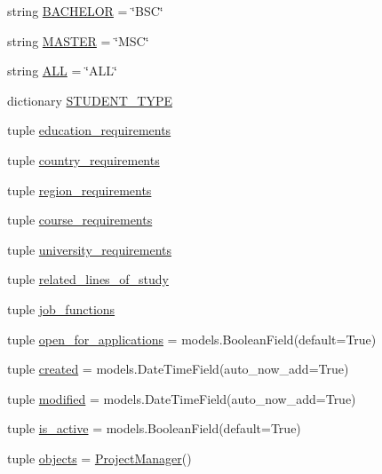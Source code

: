 \begin{DoxyCompactItemize}
\item 
string \hyperlink{classprojects_1_1models_1_1_project_aa7280baf9a6ecb59f892c5d3e7ad4345}{B\-A\-C\-H\-E\-L\-O\-R} = \char`\"{}B\-S\-C\char`\"{}
\item 
string \hyperlink{classprojects_1_1models_1_1_project_a07c53fc2393e77a3cd5ae3c12f4d4441}{M\-A\-S\-T\-E\-R} = \char`\"{}M\-S\-C\char`\"{}
\item 
string \hyperlink{classprojects_1_1models_1_1_project_a1abb3db31156e503feeab76b92ad3915}{A\-L\-L} = \char`\"{}A\-L\-L\char`\"{}
\item 
dictionary \hyperlink{classprojects_1_1models_1_1_project_ac3f6c8d9f7ebc77cb51c414beb0da1ff}{S\-T\-U\-D\-E\-N\-T\-\_\-\-T\-Y\-P\-E}
\item 
tuple \hyperlink{classprojects_1_1models_1_1_project_af15ee9371804f4cc5dccd92761763aa2}{education\-\_\-requirements}
\item 
tuple \hyperlink{classprojects_1_1models_1_1_project_abda371572f3a1c5045388a5ffba1e6b8}{country\-\_\-requirements}
\item 
tuple \hyperlink{classprojects_1_1models_1_1_project_a603d1ad29d43186fbb0bcba4cf35132b}{region\-\_\-requirements}
\item 
tuple \hyperlink{classprojects_1_1models_1_1_project_a9c306c9ac4d1b984e7e9e1339e48a0e7}{course\-\_\-requirements}
\item 
tuple \hyperlink{classprojects_1_1models_1_1_project_a28d10ba02919498d63374cbc2c86b8e6}{university\-\_\-requirements}
\item 
tuple \hyperlink{classprojects_1_1models_1_1_project_a8a35d7613094420176b855e33f7f6cc6}{related\-\_\-lines\-\_\-of\-\_\-study}
\item 
tuple \hyperlink{classprojects_1_1models_1_1_project_a3bde62b2dc114b1a43400f6d65819039}{job\-\_\-functions}
\item 
tuple \hyperlink{classprojects_1_1models_1_1_project_ad7a6f4cb2b352a988bc7bfd32d99b4fa}{open\-\_\-for\-\_\-applications} = models.\-Boolean\-Field(default=True)
\item 
tuple \hyperlink{classprojects_1_1models_1_1_project_a0acca6def6fef352cf9af652a74461ab}{created} = models.\-Date\-Time\-Field(auto\-\_\-now\-\_\-add=True)
\item 
tuple \hyperlink{classprojects_1_1models_1_1_project_ada2e74dbe16babff749ec80058bfcd99}{modified} = models.\-Date\-Time\-Field(auto\-\_\-now\-\_\-add=True)
\item 
tuple \hyperlink{classprojects_1_1models_1_1_project_a0ba53281e7601f7aa470c5a7b3e71d6c}{is\-\_\-active} = models.\-Boolean\-Field(default=True)
\item 
tuple \hyperlink{classprojects_1_1models_1_1_project_a22a79d939594eb73e56095e8cfb2d314}{objects} = \hyperlink{classprojects_1_1models_1_1_project_manager}{Project\-Manager}()
\end{DoxyCompactItemize}


